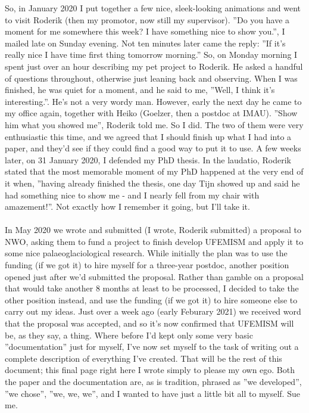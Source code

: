 \documentclass{article}
\begin{document}
So, in January 2020 I put together a few nice, sleek-looking animations and went to visit Roderik (then my promotor, now still my supervisor). ''Do you have a moment for me somewhere this week? I have something nice to show you.'', I mailed late on Sunday evening. Not ten minutes later came the reply: ''If it's really nice I have time first thing tomorrow morning.'' So, on Monday morning I spent just over an hour describing my pet project to Roderik. He asked a handful of questions throughout, otherwise just leaning back and observing. When I was finished, he was quiet for a moment, and he said to me, ''Well, I think it's interesting.''. He's not a very wordy man. However, early the next day he came to my office again, together with Heiko (Goelzer, then a postdoc at IMAU). ''Show him what you showed me'', Roderik told me. So I did. The two of them were very enthusiastic this time, and we agreed that I should finish up what I had into a paper, and they'd see if they could find a good way to put it to use. A few weeks later, on 31 January 2020, I defended my PhD thesis. In the laudatio, Roderik stated that the most memorable moment of my PhD happened at the very end of it when, ''having already finished the thesis, one day Tijn showed up and said he had something nice to show me - and I nearly fell from my chair with amazement!''. Not exactly how I remember it going, but I'll take it.\\
\\
In May 2020 we wrote and submitted (I wrote, Roderik submitted) a proposal to NWO, asking them to fund a project to finish develop UFEMISM and apply it to some nice palaeoglaciological research. While initially the plan was to use the funding (if we got it) to hire myself for a three-year postdoc, another position opened just after we'd submitted the proposal. Rather than gamble on a proposal that would take another 8 months at least to be processed, I decided to take the other position instead, and use the funding (if we got it) to hire someone else to carry out my ideas. Just over a week ago (early Feburary 2021) we received word that the proposal was accepted, and so it's now confirmed that UFEMISM will be, as they say, a thing. Where before I'd kept only some very basic ''documentation'' just for myself, I've now set myself to the task of writing out a complete description of everything I've created. That will be the rest of this document; this final page right here I wrote simply to please my own ego. Both the paper and the documentation are, as is tradition, phrased as ''we developed'', ''we chose'', ''we, we, we'', and I wanted to have just a little bit all to myself. Sue me.
\end{document}
